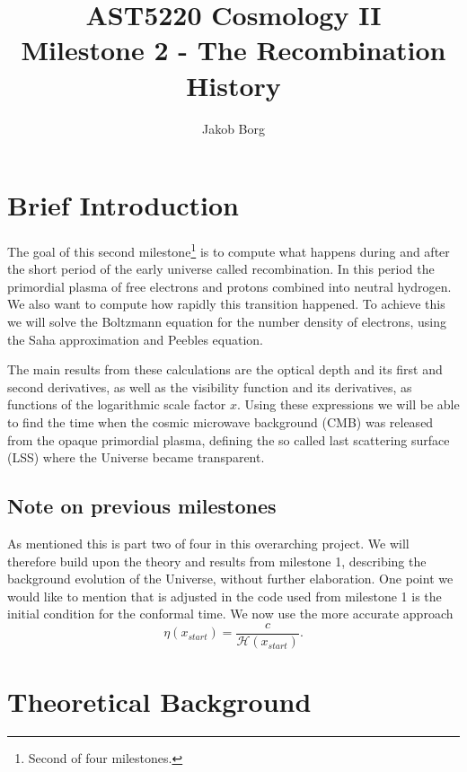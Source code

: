 \documentclass[10pt,a4paper]{article}
\title{AST5220 Cosmology \rm{II}\\ 
\vspace{5mm}Milestone 2 - The Recombination History}
\author{Jakob Borg}
\begin{document}
\maketitle
{}
 
\section{Brief Introduction}
The goal of this second milestone\footnote{Second of four milestones.} is to compute what happens during and after the short period of the early universe called recombination. In this period the primordial plasma of free electrons and protons combined into neutral hydrogen. We also want to compute how rapidly this transition happened. To achieve this we will solve the Boltzmann equation for the number density of electrons, using the Saha approximation and Peebles equation.

The main results from these calculations are the optical depth and its first and second derivatives, as well as the visibility function and its derivatives, as functions of the logarithmic scale factor $x$. Using these expressions we will be able to find the time when the cosmic microwave background (CMB) was released from the opaque primordial plasma, defining the so called last scattering surface (LSS) where the Universe became transparent.


\subsection{Note on previous milestones}
As mentioned this is part two of four in this overarching project. We will therefore build upon the theory and results from milestone 1\citep{milestone1}, describing the background evolution of the Universe, without further elaboration. One point we would like to mention that is adjusted in the code used from milestone 1 is the initial condition for the conformal time. We now use the more accurate approach
\begin{equation*}
    \eta(x_{start}) = \frac{c}{\mathcal{H}(x_{start})}.
\end{equation*}

\section{Theoretical Background}
\label{sec:Theory}
\end{document}
